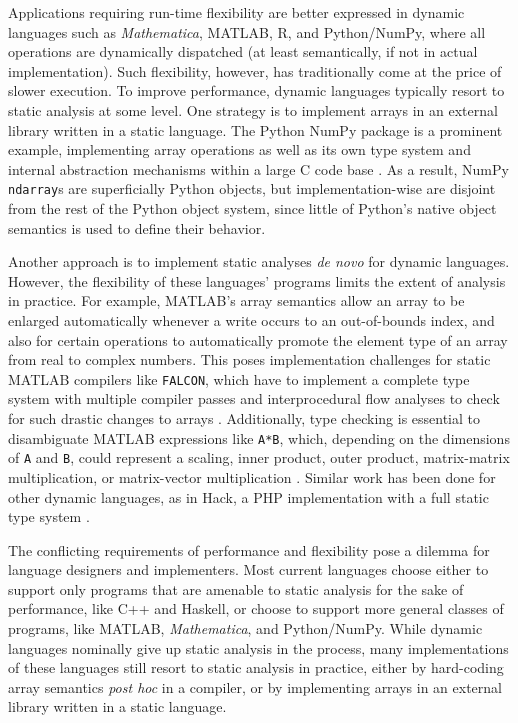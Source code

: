 \documentclass{sigplanconf}
\newcommand{\MATLAB}{\textsc{MATLAB}}
\newcommand{\Mathematica}{\textit{Mathematica}}
\newcommand{\code}[1]{\texttt{#1}}
\begin{document}
Applications requiring run-time flexibility are better expressed in
dynamic languages such as \Mathematica, \MATLAB, R, and Python/NumPy, where
all operations are dynamically dispatched (at least semantically, if not
in actual implementation). Such flexibility,
however, has traditionally come at the price of slower execution.
To improve performance, dynamic languages typically resort to static analysis
at some level.
One strategy is to implement arrays in an external library
written in a static language.
The Python NumPy package is a prominent example, implementing array operations
as well as its own type system and internal abstraction mechanisms within
a large C code base \cite{Walt:2011np}. As a result, NumPy \code{ndarray}s are
superficially Python objects, but implementation-wise are disjoint from the
rest of the Python object system, since little of Python's native object
semantics is used to define their behavior.

Another approach is to implement static analyses
\textit{de novo} for dynamic languages. However, the flexibility
of these languages' programs limits the extent of analysis in practice. For example, \MATLAB's array
semantics allow an array to be enlarged automatically whenever a write occurs
to an out-of-bounds index, and also for certain operations to
automatically promote the element type of an array from real to complex
numbers. This poses implementation challenges for static \MATLAB{} compilers
like \code{FALCON}, which have to implement a complete type system with
multiple compiler passes and interprocedural flow analyses to check
for such drastic changes to arrays \cite{Rose:1999tt,
Li:2013mf}. Additionally, type checking is essential to disambiguate
\MATLAB{} expressions like \code{A*B}, which, depending on the dimensions of
\code{A} and \code{B}, could represent a scaling, inner product, outer
product, matrix-matrix multiplication, or matrix-vector multiplication
\cite{Rose:1999tt}. Similar work has been done for other dynamic languages,
as in Hack, a PHP implementation with a full static type system
\cite{Verlaguet:2014hn}.


The conflicting requirements of performance and flexibility pose a dilemma for
language designers and implementers. Most current languages choose either to
support only programs that are amenable to static analysis for the sake of
performance, like C++ and Haskell, or choose to support more general
classes of programs, like \MATLAB, \Mathematica, and Python/NumPy. While
dynamic languages nominally give up static analysis in the process, many
implementations of these languages still resort to static analysis in
practice, either by hard-coding array semantics \textit{post hoc} in a compiler, or by
implementing arrays in an external library written in a static language.
\end{document}
